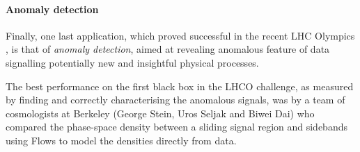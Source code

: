 \paragraph{Anomaly detection}

Finally, one last application, which proved successful in the recent LHC Olympics \cite{Kasieczka_2021}, is that of \emph{anomaly detection}, aimed at revealing anomalous feature of data signalling potentially new and insightful physical processes.

The best performance on the first black box in the LHCO challenge, as measured by finding and correctly characterising the anomalous signals, was by a team of cosmologists at Berkeley (George Stein, Uros Seljak and Biwei Dai) who compared the phase-space density between a sliding signal region and sidebands using Flows to model the densities directly from data.

